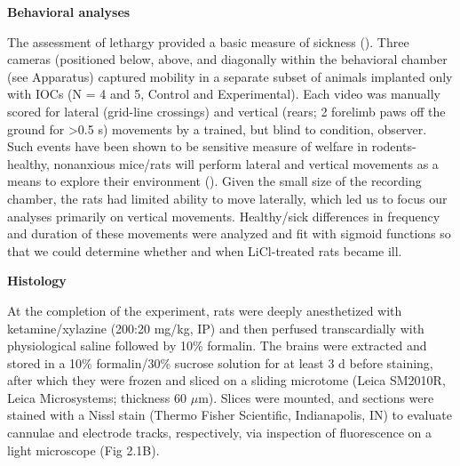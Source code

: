 \begin{refsection}
\smallskip
\noindent\textbf{Behavioral analyses}\par
\noindent 
The assessment of lethargy provided a basic measure of sickness (\cite{parker1982a,kent1992a}). Three cameras (positioned below, above, and diagonally within the behavioral chamber (see Apparatus) captured mobility in a separate subset of animals implanted only with IOCs (N = 4 and 5, Control and Experimental). Each video was manually scored for lateral (grid-line crossings) and vertical (rears; 2 forelimb paws off the ground for \textgreater0.5 s) movements by a trained, but blind to condition, observer. Such events have been shown to be sensitive measure of welfare in rodents-healthy, nonanxious mice/rats will perform lateral and vertical movements as a means to explore their environment (\cite{nachman1975a,cross-mellor2009a}). Given the small size of the recording chamber, the rats had limited ability to move laterally, which led us to focus our analyses primarily on vertical movements. Healthy/sick differences in frequency and duration of these movements were analyzed and fit with sigmoid functions so that we could determine whether and when LiCl-treated rats became ill.

\smallskip
\noindent\textbf{Histology}\par
\noindent 
At the completion of the experiment, rats were deeply anesthetized with ketamine/xylazine (200:20 mg/kg, IP) and then perfused transcardially with physiological saline followed by 10\% formalin. The brains were extracted and stored in a 10\% formalin/30\% sucrose solution for at least 3 d before staining, after which they were frozen and sliced on a sliding microtome (Leica SM2010R, Leica Microsystems; thickness 60 \(\mu\)m). Slices were mounted, and sections were stained with a Nissl stain (Thermo Fisher Scientific, Indianapolis, IN) to evaluate cannulae and electrode tracks, respectively, via inspection of fluorescence on a light microscope (Fig 2.1B).


\end{refsection}
